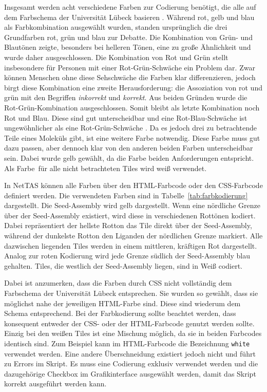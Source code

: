 Insgesamt werden acht verschiedene Farben zur Codierung benötigt, die alle auf dem Farbschema der Universität Lübeck basieren \cite{braun2018uzlcolor}. Während rot, gelb und blau als Farbkombination ausgewählt wurden, standen ursprünglich die drei Grundfarben rot, grün und blau zur Debatte. Die Kombination von Grün- und Blautönen zeigte, besonders bei helleren Tönen, eine zu große Ähnlichkeit und wurde daher ausgeschlossen. Die Kombination von Rot und Grün stellt insbesondere für Personen mit einer Rot-Grün-Schwäche ein Problem dar. Zwar können Menschen ohne diese Sehschwäche die Farben klar differenzieren, jedoch birgt diese Kombination eine zweite Herausforderung: die Assoziation von rot und grün mit den Begriffen \emph{inkorrekt} und \emph{korrekt}. Aus beiden Gründen wurde die Rot-Grün-Kombination ausgeschlossen. Somit bleibt als letzte Kombination noch Rot und Blau. Diese sind gut unterscheidbar und eine Rot-Blau-Schwäche ist ungewöhnlicher als eine Rot-Grün-Schwäche \cite{birch2012colorblindness}. 
Da es jedoch drei zu betrachtende Teile eines Moleküls gibt, ist eine weitere Farbe notwendig. Diese Farbe muss gut dazu passen, aber dennoch klar von den anderen beiden Farben unterscheidbar sein. Dabei wurde gelb gewählt, da die Farbe beiden Anforderungen entspricht. Als \glqq Farbe\grqq\, für alle nicht betrachteten Tiles wird weiß verwendet. 

In NetTAS können alle Farben über den HTML-Farbcode oder den CSS-Farbcode definiert werden. Die verwendeten Farben sind in Tabelle~\ref{tab:farbkodierung} dargestellt. Die Seed-Assembly wird gelb dargestellt. Wenn eine nördliche Grenze über der Seed-Assembly existiert, wird diese in verschiedenen Rottönen kodiert. Dabei repräsentiert der hellste Rotton das Tile direkt über der Seed-Assembly, während der dunkelste Rotton den Liganden der nördlichen Grenze markiert. Alle dazwischen liegenden Tiles werden in einem mittleren, kräftigen Rot dargestellt. Analog zur roten Kodierung wird jede Grenze südlich der Seed-Assembly blau gehalten. Tiles, die westlich der Seed-Assembly liegen, sind in Weiß codiert.

Dabei ist anzumerken, dass die Farben durch CSS nicht vollständig dem Farbschema der Universität Lübeck entsprechen. Sie wurden so gewählt, dass sie möglichst nahe der jeweiligen HTML-Farbe sind. Diese sind wiederum dem Schema entsprechend. Bei der Farbkodierung sollte beachtet werden, dass konsequent entweder der CSS- oder der HTML-Farbcode genutzt werden sollte. Einzig bei den weißen Tiles ist eine Mischung möglich, da sie in beiden Farbcodes identisch sind. Zum Beispiel kann im HTML-Farbcode die Bezeichnung \texttt{white} verwendet werden. Eine andere Überschneidung existiert jedoch nicht und führt zu Errors im Skript. Es muss eine Codierung exklusiv verwendet werden und die dazugehörige Checkbox im Grafikinterface ausgewählt werden, damit das Skript korrekt ausgeführt werden kann.

